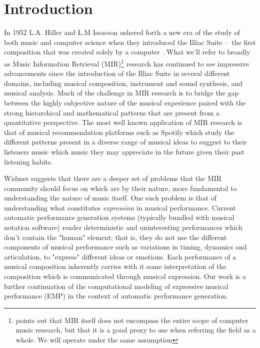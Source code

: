 \chapter{Introduction} \label{ch:introduction}

In 1952 L.A. Hiller and L.M Issacson ushered forth a new era of the study of both music and computer science when they introduced the Illiac Suite – the first composition that was created solely by a computer \cite{sandred2009revisiting}. What we'll refer to broadly as Music Information Retrieval (MIR)\footnote{\citet{widmer2016getting} points out that MIR itself does not encompass the entire scope of computer music research, but that it is a good proxy to use when referring the field as a whole. We will operate under the same assumption} research has continued to see impressive advancements since the introduction of the Illiac Suite in several different domains, including musical composition\cite{briot2017deep}, instrument and sound synthesis\cite{engel2017neural}, and musical analysis\cite{widmer2016getting}. Much of the challenge in MIR research is to bridge the gap between the highly subjective nature of the musical experience paired with the strong hierarchical and mathematical patterns that are present from a quantitative perspective. The most well known application of MIR research is that of musical recommendation platforms such as Spotify which study the different patterns present in a diverse range of musical ideas to suggest to their listeners music which music they may appreciate in the future given their past listening habits. 

Widmer\cite{widmer2016getting} suggests that there are a deeper set of problems that the MIR community should focus on which are by their nature, more fundamental to understanding the nature of music itself. One such problem is that of understanding what constitutes \emph{expression} in musical performance. Current automatic performance generation systems (typically bundled with musical notation software) render deterministic and uninteresting performances which don't contain the "human" element; that is, they do not use the different components of musical performance such as variations in timing, dynamics and articulation, to "express" different ideas or emotions. Each performance of a musical composition inherently carries with it some interpretation of the composition which is communicated through musical expression. Our work is a further continuation of the computational modeling of expressive musical performance (EMP) in the context of automatic performance generation. 

